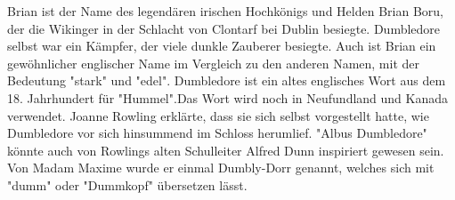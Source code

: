 \documentclass[a4paper, 10pt]{article}
\begin{document}
\vspace{10pt}
\newline
Brian ist der Name des legendären irischen Hochkönigs und Helden Brian Boru, der die Wikinger in der Schlacht von Clontarf bei Dublin besiegte. Dumbledore selbst war ein Kämpfer, der viele dunkle Zauberer besiegte. Auch ist Brian ein gewöhnlicher englischer Name im Vergleich zu den anderen Namen, mit der Bedeutung "stark" und "edel".
\vspace{10pt}
\newline
Dumbledore ist ein altes englisches Wort aus dem 18. Jahrhundert für "Hummel".Das Wort wird noch in Neufundland und Kanada verwendet. Joanne Rowling erklärte, dass sie sich selbst vorgestellt hatte, wie Dumbledore vor sich hinsummend im Schloss herumlief.
\vspace{10pt}
\newline
"Albus Dumbledore" könnte auch von Rowlings alten Schulleiter Alfred Dunn inspiriert gewesen sein.
Von Madam Maxime wurde er einmal Dumbly-Dorr genannt, welches sich mit "dumm" oder "Dummkopf" übersetzen lässt.
\end{document}
